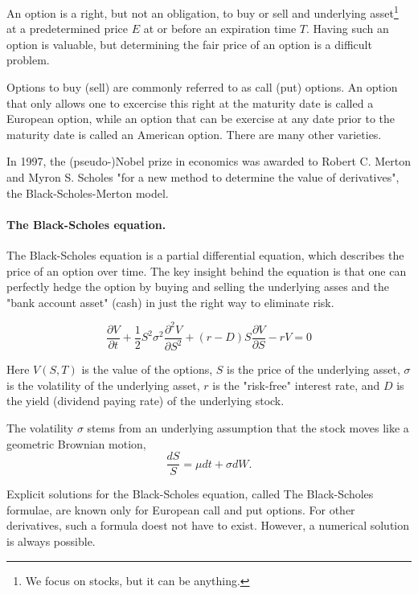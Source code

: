 \documentclass[%
oneside,                 %
final,                   %
10pt]{article}
\begin{document}
An option is a right, but not an obligation, to buy or sell 
and underlying asset\footnote{We focus on stocks, but it can be anything.} at a predetermined price $E$ at or before 
an expiration time $T$. Having such an option is valuable, but
determining the fair price of an option is a difficult problem.



Options to buy (sell) are commonly referred to as 
call (put) options. An option that only allows one to 
excercise this right at the maturity date is called a 
European option, while an option that can be exercise at any 
date prior to the maturity date is called an American option.
There are many other varieties.

In 1997, the (pseudo-)Nobel prize in economics was awarded 
to Robert C. Merton and Myron S. Scholes "for a new method
to determine the value of derivatives", the Black-Scholes-Merton
model.

\paragraph{The Black-Scholes equation.}
The Black-Scholes equation is a partial differential equation, which 
describes the price of an option over time. The key insight behind the 
equation is that one can perfectly hedge the option by 
buying and selling the underlying asses and the "bank account 
asset" (cash) in just the right way to eliminate risk.

\begin{equation}
    \frac{\partial V}{\partial t}
    + \frac{1}{2}S^2\sigma^2\frac{\partial^2 V}{\partial S^2}
    + (r - D)S\frac{\partial V}{\partial S} - r V = 0
\end{equation}

Here $V(S, T)$ is the value of the options, $S$ is the price of the 
underlying asset, $\sigma$ is the volatility of the underlying asset,
$r$ is the "risk-free" interest rate, and $D$ is the yield
(dividend paying rate) of the underlying stock.

The volatility $\sigma$ stems from an underlying assumption that 
the stock moves like a geometric Brownian motion,
\begin{equation}
    \frac{dS}{S} = \mu dt + \sigma dW.
\end{equation}

Explicit solutions for the Black-Scholes equation,
called The Black-Scholes formulae, are known only for 
European call and put options. For other derivatives, such 
a formula doest not have to exist. However, a numerical solution is 
always possible.
\end{document}
